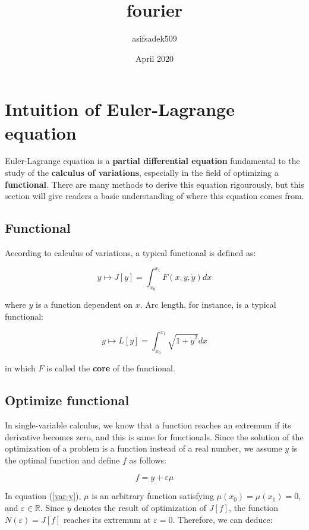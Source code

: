 \documentclass{article}
\title{fourier}
\author{asifsadek509 }
\date{April 2020}
\begin{document}
\section{Intuition of Euler-Lagrange equation}

Euler-Lagrange equation is a \textbf{partial differential equation} fundamental
to the study of the \textbf{calculus of variations}, especially in the field of
optimizing a \textbf{functional}. There are many methods to derive this
equation rigourously, but this section will give readers a basic understanding
of where this equation comes from.

\subsection{Functional}

According to calculus of variations, a typical functional is defined as:

\begin{equation}
	y\mapsto J[y]=\int_{x_0}^{x_1}F(x,y,\dot{y})dx
	\label{functional-def}
\end{equation}

where $y$ is a function dependent on $x$. Arc length, for instance, is a
typical functional:

$$
y\mapsto L[y]=\int_{x_0}^{x_1}\sqrt{1+\dot{y}^2}dx
$$

in which $F$ is called the \textbf{core} of the functional.

\subsection{Optimize functional}

In single-variable calculus, we know that a function reaches an extremum if its
derivative becomes zero, and this is same for functionals. Since the solution
of the optimization of a problem is a function instead of a real number, we
assume $y$ is the optimal function and define $f$ as follows:

\begin{equation}
	f=y+\varepsilon\mu
	\label{var-y}
\end{equation}

In equation (\ref{var-y}), $\mu$ is an arbitrary function satisfying
$\mu(x_0)=\mu(x_1)=0$, and $\varepsilon\in\mathbb{R}$. Since $y$ denotes the
result of optimization of $J[f]$, the function $N(\varepsilon)=J[f]$ reaches
its extremum at $\varepsilon=0$. Therefore, we can deduce:
\end{document}
